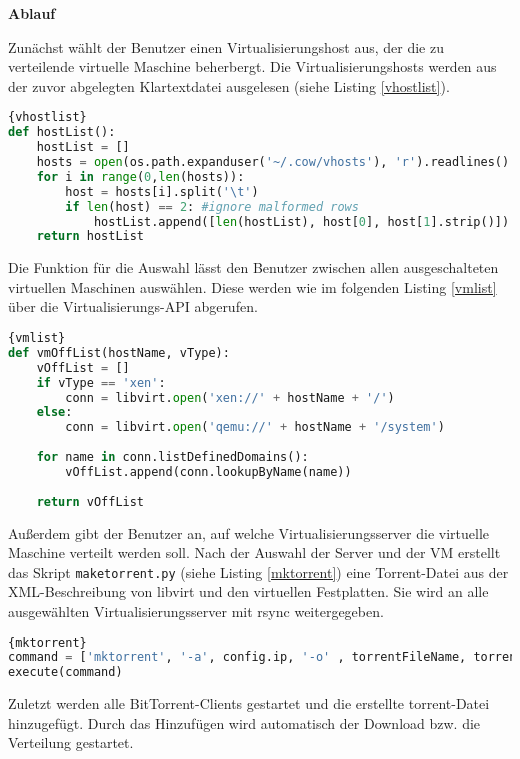 \textbf{Ablauf}

Zunächst wählt der Benutzer einen Virtualisierungshost aus, der die zu verteilende virtuelle Maschine beherbergt. Die Virtualisierungshosts werden aus der zuvor abgelegten Klartextdatei ausgelesen (siehe Listing \ref{vhostlist}).
\\
\begin{lstlisting}[caption=Auslesen der registrierten Virtualisierungshosts (cow.py),language=Python,label=vhostlist]{vhostlist}
def hostList():
	hostList = []
	hosts = open(os.path.expanduser('~/.cow/vhosts'), 'r').readlines()
	for i in range(0,len(hosts)):
		host = hosts[i].split('\t')
		if len(host) == 2: #ignore malformed rows
			hostList.append([len(hostList), host[0], host[1].strip()])
	return hostList
\end{lstlisting}

Die Funktion für die Auswahl lässt den Benutzer zwischen allen ausgeschalteten virtuellen Maschinen auswählen. Diese werden wie im folgenden Listing \ref{vmlist} über die Virtualisierungs-API abgerufen.
\\
\begin{lstlisting}[caption=Abruf der ausgeschalteten virtuellen Maschine mit libvirt (cow.py),language=Python, label=vmlist]{vmlist}
def vmOffList(hostName, vType):
	vOffList = []
	if vType == 'xen':
		conn = libvirt.open('xen://' + hostName + '/')
	else:
		conn = libvirt.open('qemu://' + hostName + '/system')
	
	for name in conn.listDefinedDomains():
		vOffList.append(conn.lookupByName(name))
	
	return vOffList
\end{lstlisting}
Außerdem gibt der Benutzer an, auf welche Virtualisierungsserver die virtuelle Maschine verteilt werden soll. Nach der Auswahl der Server und der VM erstellt das Skript \lstinline|maketorrent.py| (siehe Listing \ref{mktorrent}) eine Torrent-Datei aus der XML-Beschreibung von libvirt und den virtuellen Festplatten. Sie wird an alle ausgewählten Virtualisierungsserver mit rsync weitergegeben. 
\\
\begin{lstlisting}[caption=Erstellen der Torrent-Datei (maketorrent.py),language=Python, label=mktorrent]{mktorrent}
command = ['mktorrent', '-a', config.ip, '-o' , torrentFileName, torrentDir]
execute(command)
\end{lstlisting}
Zuletzt werden alle BitTorrent-Clients gestartet und die erstellte torrent-Datei hinzugefügt. Durch das Hinzufügen wird automatisch der Download bzw. die Verteilung gestartet.

